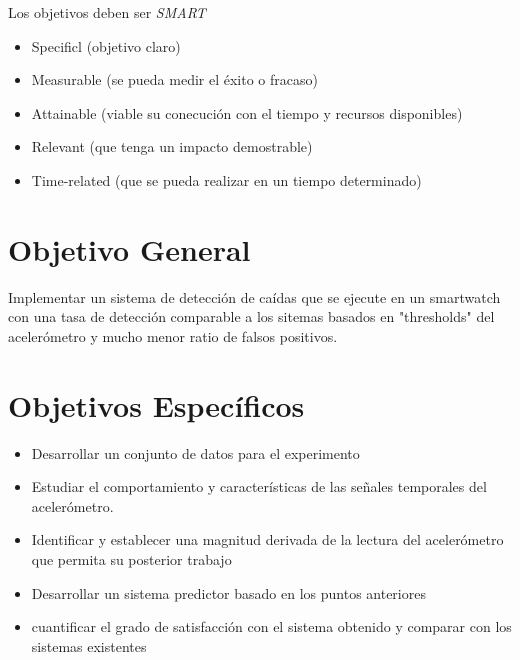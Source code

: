 \documentclass[../tfm.tex]{subfiles}
\begin{document}

Los objetivos deben ser \textit{SMART}
\begin{itemize}
  \item Specificl (objetivo claro)
  \item Measurable (se pueda medir el éxito o fracaso)
  \item Attainable (viable su conecución con el tiempo y recursos disponibles)
  \item Relevant (que tenga un impacto demostrable)
  \item Time-related (que se pueda realizar en un tiempo determinado)
\end{itemize}


\section{Objetivo General}

Implementar un sistema de detección de caídas que se ejecute en un smartwatch con una tasa de detección comparable a los sitemas basados en "thresholds" del acelerómetro y mucho menor ratio de falsos positivos.

\section{Objetivos Específicos}
\begin{itemize}
  \item Desarrollar un conjunto de datos para el experimento
  \item Estudiar el comportamiento y características de las señales temporales del acelerómetro.
  \item Identificar y establecer una magnitud derivada de la lectura del acelerómetro que permita su posterior trabajo
  \item Desarrollar un sistema predictor basado en los puntos anteriores
  \item cuantificar el grado de satisfacción con el sistema obtenido y comparar con los sistemas existentes
\end{itemize}
\end{document}
